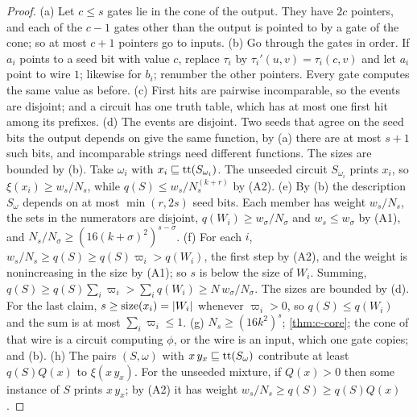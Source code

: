 \begin{proof}
(a) Let $c\le s$ gates lie in the cone of the output. They have $2c$ pointers, and each of the $c-1$ gates
other than the output is pointed to by a gate of the cone; so at most $c+1$ pointers go to inputs. (b) Go
through the gates in order. If $a_i$ points to a seed bit with value $c$, replace $\tau_i$ by
$\tau_i'(u,v)=\tau_i(c,v)$ and let $a_i$ point to wire $1$; likewise for $b_i$; renumber the other pointers.
Every gate computes the same value as before. (c) First hits are pairwise incomparable, so the events are
disjoint; and a circuit has one truth table, which has at most one first hit among its prefixes. (d) The
events are disjoint. Two seeds that agree on the seed bits the output depends on give the same function, by
(a) there are at most $s+1$ such bits, and incomparable strings need different functions. The sizes are
bounded by (b). Take $\omega_i$ with $x_i\sqsubseteq\mathrm{tt}(S_{\omega_i})$. The unseeded circuit $S_{\omega_i}$ prints
$x_i$, so $\xi(x_i)\ge w_s/N_s$, while $q(S)\le w_s/N^{(k+r)}_s$ by (A2). (e) By (b) the description
$S_\omega$ depends on at most $\min(r,2s)$ seed bits. Each member has weight $w_s/N_s$, the sets in the
numerators are disjoint, $q(W_i)\ge w_\sigma/N_\sigma$ and $w_s\le w_\sigma$ by (A1), and
$N_s/N_\sigma\ge(16(k+\sigma)^2)^{s-\sigma}$. (f) For each $i$, $w_s/N_s\ge q(S)\ge q(S)\varpi_i>q(W_i)$, the
first step by (A2), and the weight is nonincreasing in the size by (A1); so $s$ is below the size of $W_i$.
Summing, $q(S)\ge q(S)\sum_i\varpi_i>\sum_iq(W_i)\ge N\,w_\sigma/N_\sigma$. The sizes are bounded by (d). For
the last claim, $s\ge\mathrm{size}(x_i)=|W_i|$ whenever $\varpi_i>0$, so $q(S)\le q(W_i)$ and the sum is at most
$\sum_i\varpi_i\le1$. (g) $N_s\ge(16k^2)^s$; \cref{thm:c-core}; the cone of that wire is a circuit computing
$\phi$, or the wire is an input, which one gate copies; and (b). (h) The pairs $(S,\omega)$ with
$x\,y_x\sqsubseteq\mathrm{tt}(S_\omega)$ contribute at least $q(S)Q(x)$ to $\xi(x\,y_x)$. For the unseeded mixture, if
$Q(x)>0$ then some instance of $S$ prints $x\,y_x$; by (A2) it has weight $w_s/N_s\ge q(S)\ge q(S)Q(x)$.
\end{proof}

